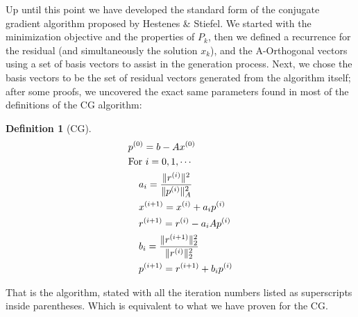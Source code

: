 \documentclass[]{article}
\theoremstyle{definition}
\newtheorem{definition}{Definition}      %
\begin{document}
            Up until this point we have developed the standard form of the conjugate gradient algorithm proposed by Hestenes \& Stiefel\cite{paper:cg_original}.   We started with the minimization objective and the properties of $P_k$, then we defined a recurrence for the residual (and simultaneously the solution $x_k$), and the A-Orthogonal vectors using a set of basis vectors to assist in the generation process. Next, we chose the basis vectors to be the set of residual vectors generated from the algorithm itself; after some proofs, we uncovered the exact same parameters found in most of the definitions of the CG algorithm:
            \begin{definition}[CG]\label{def:CG}
                \begin{align}
                    & p^{(0)} = b - Ax^{(0)} 
                    \\&
                    \text{For } i = 0,1, \cdots
                    \\&\hspace{1.1em}
                    \begin{aligned}
                        & a_{i} = \frac{\Vert r^{(i)}\Vert^2}{\Vert p^{(i)}\Vert^2_A}
                        \\
                        & x^{(i + 1)} = x^{(i)} + a_i p^{(i)}
                        \\
                        & r^{(i + 1)} = r^{(i)} - a_iAp^{(i)}
                        \\
                        & b_{i} = \frac{\Vert r^{(i + 1)}\Vert_2^2}{\Vert r^{(i)}\Vert_2^2}
                        \\
                        & p^{(i + 1)} = r^{(i + 1)} + b_{i}p^{(i)}
                    \end{aligned}
                \end{align}
            \end{definition}
            That is the algorithm, stated with all the iteration numbers listed as superscripts inside parentheses. Which is equivalent to what we have proven for the CG.
\end{document}

